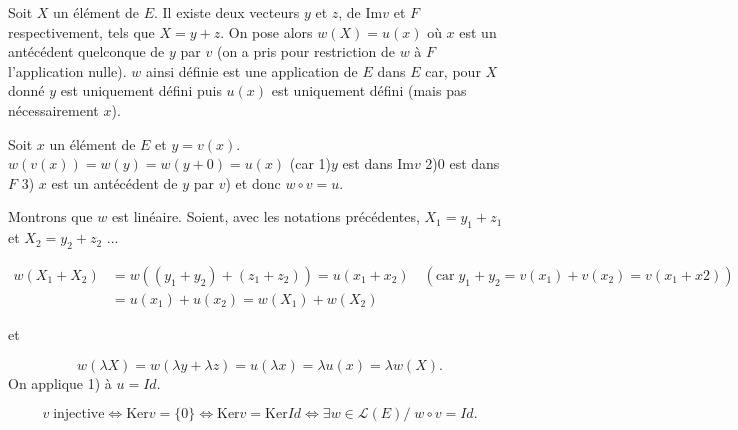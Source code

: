{\begin{enumerate}
{Soit $X$ un élément de $E$. Il existe deux vecteurs $y$ et $z$, de $\mbox{Im}v$ et $F$ respectivement, tels que $X=y+z$.
On pose alors $w(X)=u(x)$ où $x$ est un antécédent quelconque de $y$ par $v$ (on a pris pour restriction de $w$ à $F$
l'application nulle). $w$ ainsi définie est une application de $E$ dans $E$ car, pour $X$ donné $y$ est uniquement
défini puis $u(x)$ est uniquement défini (mais pas nécessairement $x$).

Soit $x$ un élément de $E$ et $y=v(x)$. $w(v(x))=w(y)=w(y+0)=u(x)$ (car 1)$y$ est dans $\mbox{Im}v$ 2)$0$ est dans $F$
3) $x$ est un antécédent de $y$ par $v$) et donc $w\circ v=u$.

Montrons que $w$ est linéaire. Soient, avec les notations précédentes, $X_1=y_1+z_1$ et $X_2=y_2+z_2$ ...

\begin{align*}
w(X_1+X_2)&=w((y_1+y_2)+(z_1+z_2))=u(x_1+x_2)\quad(\mbox{car}\;y_1+y_2=v(x_1)+v(x_2)=v(x_1+x2))\\
 &=u(x_1)+u(x_2)=w(X_1)+w(X_2)
\end{align*}

et

$$w(\lambda X)=w(\lambda y+\lambda z)=u(\lambda x)=\lambda u(x)=\lambda w(X).$$
On applique 1) à $u=Id$.

$$v\;\mbox{injective}\Leftrightarrow\mbox{Ker}v=\{0\}\Leftrightarrow\mbox{Ker}v=\mbox{Ker}Id\Leftrightarrow\exists w\in\mathcal{L}(E)/\;w\circ v=Id.$$
}
\end{enumerate}
}
